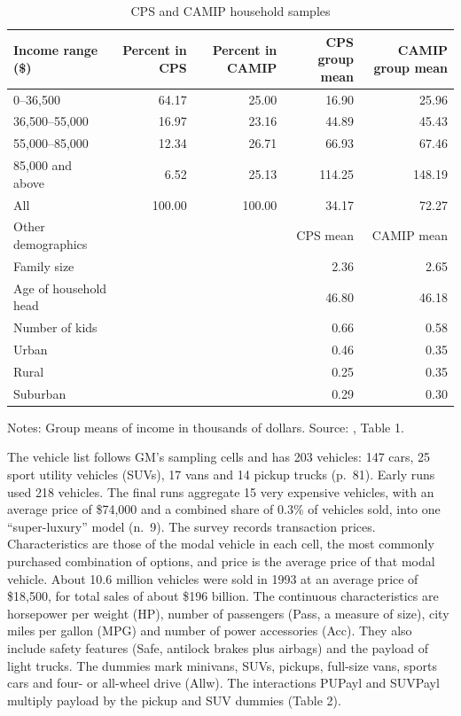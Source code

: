 \begin{table}[htbp]
\centering
\caption{CPS and CAMIP household samples}
\label{tab:08-blp04-samples}
\footnotesize
\begin{tabular}{@{}lrrrr@{}}
\toprule
Income range (\$) & Percent in CPS & Percent in CAMIP & CPS group mean & CAMIP group mean \\
\midrule
0--36,500 & 64.17 & 25.00 & 16.90 & 25.96 \\
36,500--55,000 & 16.97 & 23.16 & 44.89 & 45.43 \\
55,000--85,000 & 12.34 & 26.71 & 66.93 & 67.46 \\
85,000 and above & 6.52 & 25.13 & 114.25 & 148.19 \\
All & 100.00 & 100.00 & 34.17 & 72.27 \\
\midrule
Other demographics & & & CPS mean & CAMIP mean \\
\midrule
Family size & & & 2.36 & 2.65 \\
Age of household head & & & 46.80 & 46.18 \\
Number of kids & & & 0.66 & 0.58 \\
Urban & & & 0.46 & 0.35 \\
Rural & & & 0.25 & 0.35 \\
Suburban & & & 0.29 & 0.30 \\
\bottomrule
\end{tabular}

\smallskip
\begin{minipage}{0.86\linewidth}
\footnotesize Notes: Group means of income in thousands of dollars. Source:
\citet{BerryLevinsohnPakes2004}, Table 1.
\end{minipage}
\end{table}

 The vehicle list follows GM's sampling cells and has 203 vehicles:
147 cars, 25 sport utility vehicles (SUVs), 17 vans and 14 pickup trucks (p.~81). Early runs used 218
vehicles. The final runs aggregate 15 very expensive vehicles, with an average price of \$74,000 and a combined
share of 0.3\% of vehicles sold, into one ``super-luxury'' model (n.~9). The survey records transaction prices.
Characteristics are those of the modal vehicle in each cell, the most commonly purchased combination of
options, and price is the average price of that modal vehicle. About 10.6 million vehicles were sold in 1993
at an average price of \$18,500, for total sales of about \$196 billion. The continuous characteristics are horsepower
per weight (HP), number of passengers (Pass, a measure of size), city miles per gallon (MPG) and number of power
accessories (Acc). They also include safety features (Safe, antilock brakes plus airbags) and the payload of
light trucks. The
dummies mark minivans, SUVs, pickups, full-size vans, sports cars and four- or all-wheel drive (Allw). The interactions
PUPayl and SUVPayl multiply payload by the pickup and SUV dummies (Table 2).

